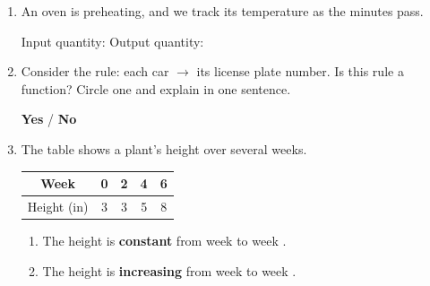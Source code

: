 \documentclass[10pt]{article}
\begin{document}

\vspace{0.12in}

\begin{enumerate}[itemsep=12pt]

\item An oven is preheating, and we track its temperature as the minutes pass.

\vspace{0.06in}
Input quantity: \blank{3.2cm} \quad Output quantity: \blank{3.6cm}

\item Consider the rule: each car $\to$ its license plate number.
Is this rule a function? Circle one and explain in one sentence.

\vspace{0.06in}
\textbf{Yes} \quad / \quad \textbf{No}

\vspace{0.12in}
\writeline

\item The table shows a plant's height over several weeks.

\smallskip
\begin{tabular}{|c|c|c|c|c|}
\hline
Week & 0 & 2 & 4 & 6 \\
\hline
Height (in) & 3 & 3 & 5 & 8 \\
\hline
\end{tabular}
\smallskip

\begin{enumerate}[label=(\alph*), itemsep=4pt]
  \item The height is \textbf{constant} from week \blank{1.2cm} to week \blank{1.2cm}.
  \item The height is \textbf{increasing} from week \blank{1.2cm} to week \blank{1.2cm}.
\end{enumerate}

\end{enumerate}
\end{document}
